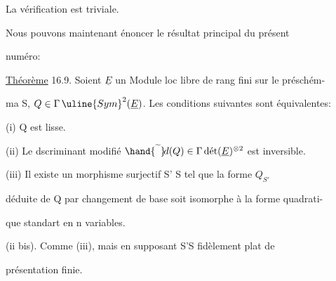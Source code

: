La vérification est triviale.

Nous pouvons maintenant énoncer le résultat principal du présent

numéro:

\uline{Théorème} 16.9. Soient $\underline{E}$ un Module loc libre de rang fini sur le préschém-%

ma S, $Q \in \Gamma\,\uline{Sym}^2(\underline{E})$. Les conditions suivantes sont équivalentes:

(i) Q est lisse.

(ii) Le dscriminant modifié $\hand{\widetilde{\phantom{d}}}\!d(Q) \in \Gamma\,\text{dét}(\underline{E})^{\otimes 2}$ est inversible.

(iii)  Il existe un morphisme surjectif S' \quad S tel que la forme $Q_{S'}$

déduite de Q par changement de base soit isomorphe à la forme quadrati-%

que standart en n variables.

(ii bis). Comme (iii), mais en supposant S'\hand{$\rightarrow$}S fidèlement plat de

présentation finie.

